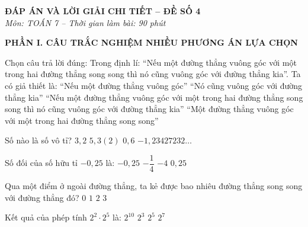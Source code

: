\documentclass[12pt,a4paper]{article}
\begin{document}
\begin{center}
\textbf{\Large ĐÁP ÁN VÀ LỜI GIẢI CHI TIẾT -- ĐỀ SỐ 4}\\
\textit{Môn: TOÁN 7 -- Thời gian làm bài: 90 phút}
\end{center}
\vspace{2mm}

\noindent\textbf{\large PHẦN I. CÂU TRẮC NGHIỆM NHIỀU PHƯƠNG ÁN LỰA CHỌN}

\vspace{1mm}
\begin{ex}
Chọn câu trả lời đúng: Trong định lí: ``Nếu một đường thẳng vuông góc với một trong hai đường thẳng song song thì nó cũng vuông góc với đường thẳng kia''. Ta có giả thiết là:
\choice
{``Nếu một đường thẳng vuông góc''}
{``Nó cũng vuông góc với đường thẳng kia''}
{``Nếu một đường thẳng vuông góc với một trong hai đường thẳng song song thì nó cũng vuông góc với đường thẳng kia''}
{\True ``Một đường thẳng vuông góc với một trong hai đường thẳng song song''}
\end{ex}

\begin{ex}
Số nào là số vô tỉ?
\choice
{$3{,}2$}
{$5{,}3(2)$}
{$0{,}6$}
{\True $-1{,}23427232\dots$}
\end{ex}

\begin{ex}
Số đối của số hữu tỉ $-0{,}25$ là:
\choice
{$-0{,}25$}
{$-\dfrac{1}{4}$}
{$-4$}
{\True $0{,}25$}
\end{ex}

\begin{ex}
Qua một điểm ở ngoài đường thẳng, ta kẻ được bao nhiêu đường thẳng song song với đường thẳng đó?
\choice
{$0$}
{\True $1$}
{$2$}
{$3$}
\end{ex}

\begin{ex}
Kết quả của phép tính $2^2 \cdot 2^5$ là:
\choice
{$2^{10}$}
{$2^3$}
{$2^5$}
{\True $2^7$}
\end{ex}
\end{document}
